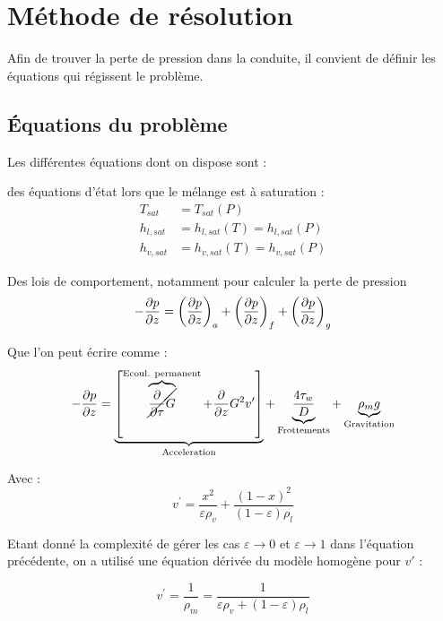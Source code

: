 \section{Méthode de résolution\label{section:res}}
Afin de trouver la perte de pression dans la conduite, il convient de définir les équations qui régissent le problème.
\subsection{Équations du problème}
Les différentes équations dont on dispose sont :

des équations d'état lors que le mélange est à saturation :
\begin{align}
    T_{sat} &= T_{sat}(P) \\
    h_{l,sat} &= h_{l,sat}(T) = h_{l,sat}(P) \\
    h_{v,sat} &= h_{v,sat}(T) = h_{v,sat}(P)
\end{align}

Des lois de comportement, notamment pour calculer la perte de pression
\begin{equation}
     -\pder[p]{z} = \left(\pder[p]{z} \right)_{a} + \left(\pder[p]{z} \right)_{f} + \left(\pder[p]{z} \right)_{g}
\end{equation}

Que l'on peut écrire comme :
\begin{equation}
    -\pder[p]{z} = \underbrace{\left[\overbrace{\cancel{\frac{\partial}{\partial \tau} G}}^{\text{Ecoul. permanent}}+\frac{\partial}{\partial z} G^{2} v^{\prime}\right]}_{\text{Acceleration}}+\underbrace{\frac{4 \tau_{w}}{D}}_{\text{Frottements}}+\underbrace{\rho_{m} g}_{\text{Gravitation}}
\label{eq:pres}
\end{equation}

Avec :
\begin{equation}
    v^{\prime}=\frac{x^{2}}{\varepsilon \rho_{v}}+\frac{(1-x)^{2}}{(1-\varepsilon) \rho_{l}}
\end{equation}

Etant donné la complexité de gérer les cas $\varepsilon \rightarrow 0$ et $\varepsilon \rightarrow 1$ dans l'équation précédente, on a utilisé une équation dérivée du modèle homogène pour $v'$ :

\begin{equation}
    v^{\prime} = \frac{1}{\rho_m} = \frac{1}{\varepsilon \rho_v + (1-\varepsilon)\rho_l }
\end{equation}

